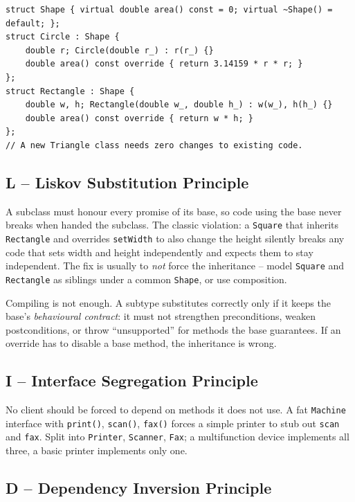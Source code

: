 \begin{lstlisting}
struct Shape { virtual double area() const = 0; virtual ~Shape() = default; };
struct Circle : Shape {
    double r; Circle(double r_) : r(r_) {}
    double area() const override { return 3.14159 * r * r; }
};
struct Rectangle : Shape {
    double w, h; Rectangle(double w_, double h_) : w(w_), h(h_) {}
    double area() const override { return w * h; }
};
// A new Triangle class needs zero changes to existing code.
\end{lstlisting}

\subsection*{L -- Liskov Substitution Principle}

A subclass must honour every promise of its base, so code using the base
never breaks when handed the subclass. The classic violation: a
\texttt{Square} that inherits \texttt{Rectangle} and overrides
\texttt{setWidth} to also change the height silently breaks any code that
sets width and height independently and expects them to stay independent.
The fix is usually to \emph{not} force the inheritance -- model
\texttt{Square} and \texttt{Rectangle} as siblings under a common
\texttt{Shape}, or use composition.

\begin{ideabox}
Compiling is not enough. A subtype substitutes correctly only if it keeps
the base's \emph{behavioural contract}: it must not strengthen
preconditions, weaken postconditions, or throw ``unsupported'' for methods
the base guarantees. If an override has to disable a base method, the
inheritance is wrong.
\end{ideabox}

\subsection*{I -- Interface Segregation Principle}

No client should be forced to depend on methods it does not use. A fat
\texttt{Machine} interface with \texttt{print()}, \texttt{scan()},
\texttt{fax()} forces a simple printer to stub out \texttt{scan} and
\texttt{fax}. Split into \texttt{Printer}, \texttt{Scanner},
\texttt{Fax}; a multifunction device implements all three, a basic printer
implements only one.

\subsection*{D -- Dependency Inversion Principle}

